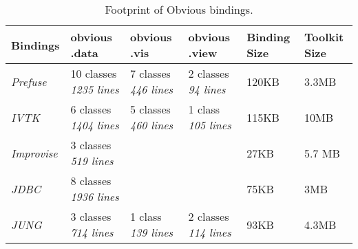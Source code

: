 \begin{table}[h]
\small
\begin{tabular}{|p{\tableCol}|p{\tableCol}|p{\tableCol}|p{\tableCol}|p{\tableCol}|p{\tableCol}|}
    \hline
    \textbf{Bindings} & \textbf{obvious\newline{.data}} & \textbf{obvious\newline{.vis}} & \textbf{obvious\newline{.view}} & \textbf{Binding Size} & \textbf{Toolkit Size} \\
    \hline
    \textit{Prefuse} & 10 classes \newline\textit{1235 lines} & 7 classes \newline\textit{446 lines} & 2 classes \newline\textit{94 lines} & 120KB & 3.3MB \\
    \hline
    \textit{IVTK} & 6 classes \newline\textit{1404 lines} & 5 classes \newline\textit{460 lines} & 1 class \newline\textit{105 lines} & 115KB & 10MB \\
    \hline
    \textit{Improvise} & 3 classes \newline\textit{519 lines} &  &  & 27KB &  5.7 MB \\
    \hline
    \textit{JDBC} & 8 classes \newline\textit{1936 lines} &  &  & 75KB & 3MB \\
    \hline
    \textit{JUNG} & 3 classes \newline\textit{714 lines} & 1 class \newline\textit{139 lines} & 2 classes \newline\textit{114 lines} & 93KB & 4.3MB \\
    \hline
\end{tabular}
\caption{Footprint of Obvious bindings. }\label{tab:obviousfootprint}
\end{table}
